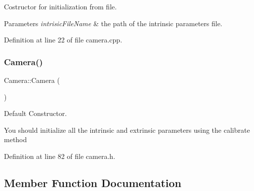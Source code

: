 Costructor for initialization from file. 


\begin{DoxyParams}{Parameters}
{\em intrisic\+File\+Name} & the path of the intrinsic parameters file. \\
\hline
\end{DoxyParams}


Definition at line 22 of file camera.\+cpp.


\begin{DoxyCode}{0}

\end{DoxyCode}
\mbox{\label{classCamera_a01f94c3543f56ede7af49dc778f19331}} 
\subsubsection{\texorpdfstring{Camera()}{Camera()}\hspace{0.1cm}{\footnotesize\ttfamily [2/2]}}
{\footnotesize\ttfamily Camera\+::\+Camera (\begin{DoxyParamCaption}{ }\end{DoxyParamCaption})\hspace{0.3cm}{\ttfamily [inline]}}



Default Constructor. 

You should initialize all the intrinsic and extrinsic parameters using the calibrate method 

Definition at line 82 of file camera.\+h.


\begin{DoxyCode}{0}

\end{DoxyCode}


\subsection{Member Function Documentation}
\mbox{\label{classCamera_a2498b18efe884472517a430db83d9c74}} 
